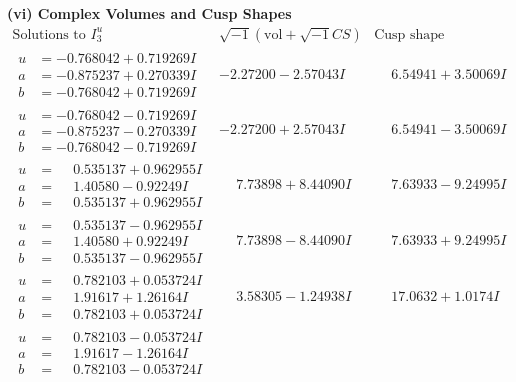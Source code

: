 \documentclass[1p]{elsarticle_modified}
\theoremstyle{definition}
\newcommand{\I}{\sqrt{-1}}
\begin{document}
\newpage\flushleft \textbf{(vi) Complex Volumes and Cusp Shapes}
$$\begin{array}{c|c|c}  
\text{Solutions to }I^u_{3}& \I (\text{vol} + \sqrt{-1}CS) & \text{Cusp shape}\\
 \hline 
\begin{aligned}
u &= -0.768042 + 0.719269 I \\
a &= -0.875237 + 0.270339 I \\
b &= -0.768042 + 0.719269 I\end{aligned}
 & -2.27200 - 2.57043 I & \phantom{-}6.54941 + 3.50069 I \\ \hline\begin{aligned}
u &= -0.768042 - 0.719269 I \\
a &= -0.875237 - 0.270339 I \\
b &= -0.768042 - 0.719269 I\end{aligned}
 & -2.27200 + 2.57043 I & \phantom{-}6.54941 - 3.50069 I \\ \hline\begin{aligned}
u &= \phantom{-}0.535137 + 0.962955 I \\
a &= \phantom{-}1.40580 - 0.92249 I \\
b &= \phantom{-}0.535137 + 0.962955 I\end{aligned}
 & \phantom{-}7.73898 + 8.44090 I & \phantom{-}7.63933 - 9.24995 I \\ \hline\begin{aligned}
u &= \phantom{-}0.535137 - 0.962955 I \\
a &= \phantom{-}1.40580 + 0.92249 I \\
b &= \phantom{-}0.535137 - 0.962955 I\end{aligned}
 & \phantom{-}7.73898 - 8.44090 I & \phantom{-}7.63933 + 9.24995 I \\ \hline\begin{aligned}
u &= \phantom{-}0.782103 + 0.053724 I \\
a &= \phantom{-}1.91617 + 1.26164 I \\
b &= \phantom{-}0.782103 + 0.053724 I\end{aligned}
 & \phantom{-}3.58305 - 1.24938 I & \phantom{-}17.0632 + 1.0174 I \\ \hline\begin{aligned}
u &= \phantom{-}0.782103 - 0.053724 I \\
a &= \phantom{-}1.91617 - 1.26164 I \\
b &= \phantom{-}0.782103 - 0.053724 I\end{aligned}

\end{array}$$
\end{document}
